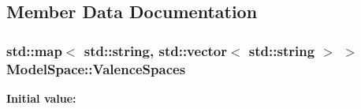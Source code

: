 \subsection{Member Data Documentation}
\hypertarget{classModelSpace_a21e4c6a5d3955dc9bf468cece4b8acc5}{
\subsubsection[{Valence\-Spaces}]{\setlength{\rightskip}{0pt plus 5cm}std\-::map$<$ std\-::string, std\-::vector$<$ std\-::string $>$ $>$ Model\-Space\-::\-Valence\-Spaces\hspace{0.3cm}{\ttfamily [static]}}}\label{classModelSpace_a21e4c6a5d3955dc9bf468cece4b8acc5}
{\bfseries Initial value\-:}
